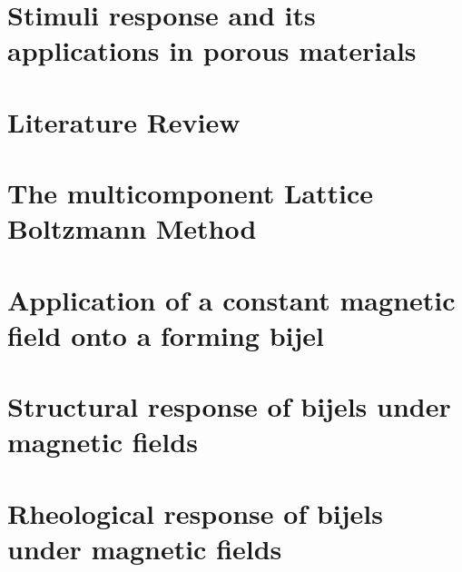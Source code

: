 \documentclass{udthesis}
\begin{document}


\chapter{Stimuli response and its applications in porous materials}


\chapter{Literature Review}


\chapter{The multicomponent Lattice Boltzmann Method}





\chapter{Application of a constant magnetic field onto a forming bijel}


\chapter{Structural response of bijels under magnetic fields}


\chapter{Rheological response of bijels under magnetic fields}



\end{document}
